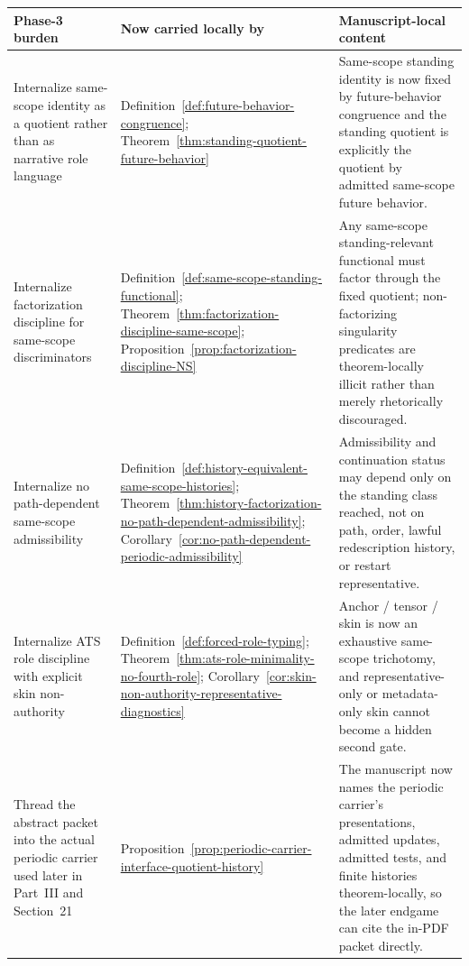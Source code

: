 \begin{center}
\footnotesize
\renewcommand{\arraystretch}{1.16}
\setlength{\tabcolsep}{4pt}
\begin{tabularx}{0.98\textwidth}{@{}L{0.31\textwidth}L{0.24\textwidth}Y@{}}
\toprule
\textbf{Phase-3 burden} & \textbf{Now carried locally by} & \textbf{Manuscript-local content}\\
\midrule
Internalize same-scope identity as a quotient rather than as narrative role language & Definition~\ref{def:future-behavior-congruence}; Theorem~\ref{thm:standing-quotient-future-behavior} & Same-scope standing identity is now fixed by future-behavior congruence and the standing quotient is explicitly the quotient by admitted same-scope future behavior.\\
Internalize factorization discipline for same-scope discriminators & Definition~\ref{def:same-scope-standing-functional}; Theorem~\ref{thm:factorization-discipline-same-scope}; Proposition~\ref{prop:factorization-discipline-NS} & Any same-scope standing-relevant functional must factor through the fixed quotient; non-factorizing singularity predicates are theorem-locally illicit rather than merely rhetorically discouraged.\\
Internalize no path-dependent same-scope admissibility & Definition~\ref{def:history-equivalent-same-scope-histories}; Theorem~\ref{thm:history-factorization-no-path-dependent-admissibility}; Corollary~\ref{cor:no-path-dependent-periodic-admissibility} & Admissibility and continuation status may depend only on the standing class reached, not on path, order, lawful redescription history, or restart representative.\\
Internalize ATS role discipline with explicit skin non-authority & Definition~\ref{def:forced-role-typing}; Theorem~\ref{thm:ats-role-minimality-no-fourth-role}; Corollary~\ref{cor:skin-non-authority-representative-diagnostics} & Anchor / tensor / skin is now an exhaustive same-scope trichotomy, and representative-only or metadata-only skin cannot become a hidden second gate.\\
Thread the abstract packet into the actual periodic carrier used later in Part~III and Section~21 & Proposition~\ref{prop:periodic-carrier-interface-quotient-history} & The manuscript now names the periodic carrier's presentations, admitted updates, admitted tests, and finite histories theorem-locally, so the later endgame can cite the in-PDF packet directly.\\
\bottomrule
\end{tabularx}
\end{center}

